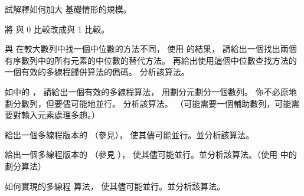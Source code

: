 \startsection[
  title={Multithreaded merge sort},
]

\startEXERCISE
試解釋如何加大  基礎情形的規模。
\stopEXERCISE

\startANSWER
將  與 0 比較改成與 1 比較。
\stopANSWER

\startEXERCISE
與  在較大數列中找一個中位數的方法不同，
使用 的結果，
請給出一個找出兩個有序數列中的所有元素的中位數的替代方法。
再給出使用這個中位數查找方法的一個有效的多線程歸併算法的僞碼。
分析該算法。
\stopEXERCISE

\startANSWER
{}
\stopANSWER

\startEXERCISE[exercise:27.3-3]
如 中的 ，
請給出一個有效的多線程算法，
用劃分元劃分一個數列。
你不必原地劃分數列，但要儘可能地並行。
分析該算法。
（\hint 可能需要一個輔助數列，可能需要對輸入元素處理多趟。）
\stopEXERCISE

\startANSWER
{}
\stopANSWER

\startEXERCISE
給出一個多線程版本的  （參見），
使其儘可能並行。並分析該算法。
\stopEXERCISE

\startANSWER
{}
\stopANSWER

\startEXERCISE\DIFFICULT
給出一個多線程版本的  （參見
），
使其儘可能並行。並分析該算法。（\hint 使用 中的劃分算法）
\stopEXERCISE

\startANSWER
{}
\stopANSWER

\startEXERCISE\DIFFICULT
如何實現 的多線程  算法，
使其儘可能並行。並分析該算法。
\stopEXERCISE

\startANSWER
{}
\stopANSWER

\stopsection
